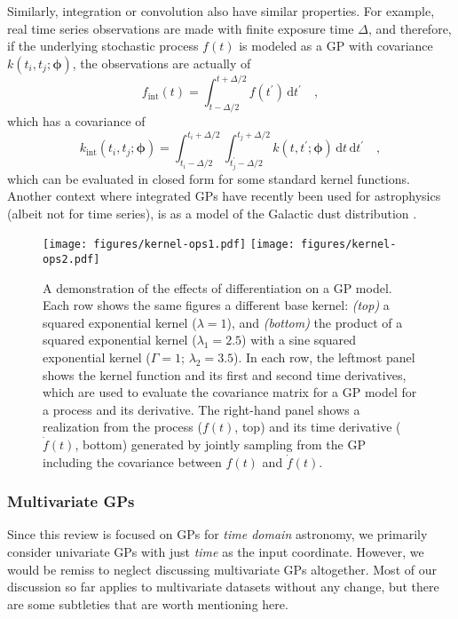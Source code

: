 \documentclass[letterpaper]{ar-1col}
\newcommand{\hyperparams}{\ensuremath{\boldsymbol{\phi}}}
\newcommand{\lengthscale}{\ensuremath{\lambda}}
\begin{document}
Similarly, integration or convolution also have similar properties.
For example, real time series observations are made with finite exposure time $\Delta$, and therefore, if the underlying stochastic process $f(t)$ is modeled as a GP with covariance $k(t_i,t_j;\hyperparams)$, the observations are actually of
\begin{equation}
  f_\mathrm{int}(t) = \int_{t-\Delta/2}^{t+\Delta/2} f(t^\prime)\,\mathrm{d}t^\prime \quad,
\end{equation}
which has a covariance of
\begin{equation}
  k_\mathrm{int}(t_i,t_j;\hyperparams) = \int_{t_i-\Delta/2}^{t_i+\Delta/2}\int_{t_j^\prime-\Delta/2}^{t_j+\Delta/2} k(t,t^\prime;\hyperparams)\,\mathrm{d}t\,\mathrm{d}t^\prime \quad,
\end{equation}
which can be evaluated in closed form for some standard kernel functions.
Another context where integrated GPs have recently been used for astrophysics (albeit not for time series), is as a model of the Galactic dust distribution \citep{2022arXiv220206797M}.

\begin{figure}[ht]
  \centering
  \texttt{[image: figures/kernel-ops1.pdf]}
  \texttt{[image: figures/kernel-ops2.pdf]}
  \caption{A demonstration of the effects of differentiation on a GP model.
  Each row shows the same figures a different base kernel: \emph{(top)} a squared exponential kernel ($\lengthscale = 1$), and \emph{(bottom)} the product of a squared exponential kernel ($\lengthscale_1 = 2.5$) with a sine squared exponential kernel ($\Gamma = 1$; $\lengthscale_2 = 3.5$).
  In each row, the leftmost panel shows the kernel function and its first and second time derivatives, which are used to evaluate the covariance matrix for a GP model for a process and its derivative.
  The right-hand panel shows a realization from the process ($f(t)$, top) and its time derivative ($\dot{f}(t)$, bottom) generated by jointly sampling from the GP including the covariance between $f(t)$ and $\dot{f}(t)$.}
  \label{fig:kernel-ops}
\end{figure}


\subsubsection{Multivariate GPs}

Since this review is focused on GPs for \emph{time domain} astronomy, we primarily consider univariate GPs with just \emph{time} as the input coordinate.
However, we would be remiss to neglect discussing multivariate GPs altogether.
Most of our discussion so far applies to multivariate datasets without any change, but there are some subtleties that are worth mentioning here.
\end{document}
